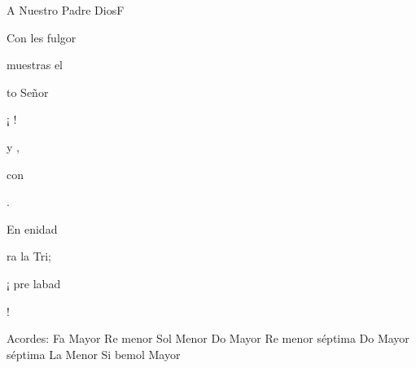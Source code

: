 \documentclass[12pt, spanish]{book}
\begin{document}
\begin{song}{A Nuestro Padre Dios}{F}
\begin{SBVerse}
            Con les fulgor

             muestras el 

             to  Señor

            ¡  !
        \end{SBVerse}

        \begin{SBVerse}
              y ,

             con 

              .

            En  enidad

            ra la Tri;

            ¡ pre labad

              !
        \end{SBVerse}

        \ifChordBk
        \begin{SBOpGroup}
            Acordes:
            \upchord{\F}\qquad Fa Mayor \hfill
            \upchord{\Dm}\qquad Re menor  \hfill\null\break
            \upchord{\Gm}\qquad Sol Menor \hfill
            \upchord{\C}\qquad Do Mayor \hfill\null\break
            \upchord{\Dmseven}\qquad Re menor s\'eptima \hfill
            \upchord{\Cseven}\qquad Do Mayor s\'eptima \hfill\null\break
            \upchord{\Am}\qquad La Menor \hfill
            \upchord{\Bflat}\qquad Si bemol Mayor \hfill\null\break
        \end{SBOpGroup}
        \fi
    \end{song}
\end{document}
